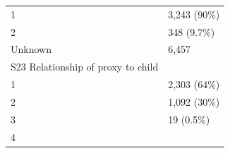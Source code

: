 \documentclass[]{article}
\begin{document}
\begin{longtable}[]{@{}ll@{}}
\begin{minipage}[t]{0.71\columnwidth}\raggedright
1\strut
\end{minipage} & \begin{minipage}[t]{0.23\columnwidth}\raggedright
3,243 (90\%)\strut
\end{minipage}\tabularnewline
\begin{minipage}[t]{0.71\columnwidth}\raggedright
2\strut
\end{minipage} & \begin{minipage}[t]{0.23\columnwidth}\raggedright
348 (9.7\%)\strut
\end{minipage}\tabularnewline
\begin{minipage}[t]{0.71\columnwidth}\raggedright
Unknown\strut
\end{minipage} & \begin{minipage}[t]{0.23\columnwidth}\raggedright
6,457\strut
\end{minipage}\tabularnewline
\begin{minipage}[t]{0.71\columnwidth}\raggedright
S23 Relationship of proxy to child\strut
\end{minipage} & \begin{minipage}[t]{0.23\columnwidth}\raggedright
\strut
\end{minipage}\tabularnewline
\begin{minipage}[t]{0.71\columnwidth}\raggedright
1\strut
\end{minipage} & \begin{minipage}[t]{0.23\columnwidth}\raggedright
2,303 (64\%)\strut
\end{minipage}\tabularnewline
\begin{minipage}[t]{0.71\columnwidth}\raggedright
2\strut
\end{minipage} & \begin{minipage}[t]{0.23\columnwidth}\raggedright
1,092 (30\%)\strut
\end{minipage}\tabularnewline
\begin{minipage}[t]{0.71\columnwidth}\raggedright
3\strut
\end{minipage} & \begin{minipage}[t]{0.23\columnwidth}\raggedright
19 (0.5\%)\strut
\end{minipage}\tabularnewline
\begin{minipage}[t]{0.71\columnwidth}\raggedright
4\strut
\end{minipage} & \begin{minipage}[t]{0.23\columnwidth}\raggedright

\end{minipage}
\end{longtable}
\end{document}
